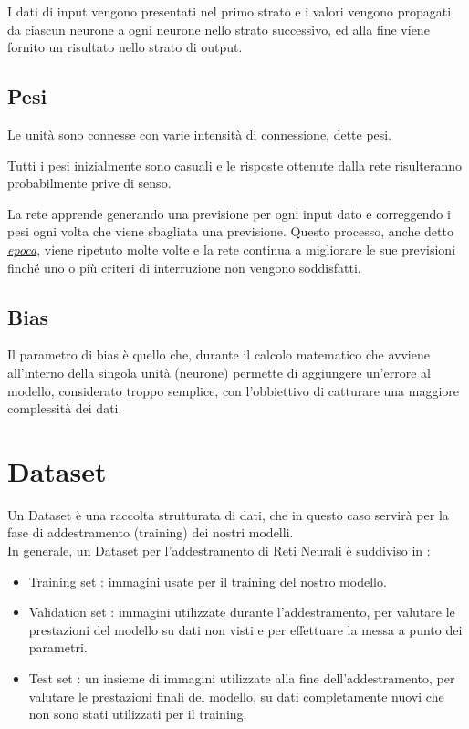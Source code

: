 \noindent
I dati di input vengono presentati nel primo strato e i valori vengono propagati da ciascun neurone a ogni neurone nello strato successivo, ed alla fine viene fornito un risultato nello strato di output. \cite{ibm_neural_model}

\subsection{Pesi}

Le unità sono connesse con varie intensità di connessione, dette \hypertarget{weights}{pesi}.

Tutti i pesi inizialmente sono casuali e le risposte ottenute dalla rete risulteranno probabilmente prive di senso.

La rete apprende generando una previsione per ogni input dato e correggendo i pesi ogni volta che viene sbagliata una previsione.
Questo processo, anche detto \hyperlink{epoch}{\textit{epoca}}, viene ripetuto molte volte e la rete continua a migliorare le sue previsioni finché uno o più criteri di interruzione non vengono soddisfatti. \cite{ibm_neural_model}

\subsection{Bias}

Il parametro di \hypertarget{b}{bias} è quello che, durante il calcolo matematico che avviene all'interno della singola unità (neurone) permette di aggiungere un'errore al modello,
considerato troppo semplice, con l'obbiettivo di catturare una maggiore complessità dei dati.

\newpage

\section{Dataset}
Un Dataset è una raccolta strutturata di dati, che in questo caso servirà per la fase di addestramento (training) dei nostri modelli. \\

\noindent
In generale, un Dataset per l'addestramento di Reti Neurali è suddiviso in :
\begin{itemize}
    \item Training set : immagini usate per il training del nostro modello.
    \item Validation set : immagini utilizzate durante l'addestramento, per valutare le prestazioni del modello su dati non visti e per effettuare la messa a punto dei parametri.
    \item Test set : un insieme di immagini utilizzate alla fine dell'addestramento, per valutare le prestazioni finali del modello, su dati completamente nuovi che non sono stati utilizzati per il training.
\end{itemize}

